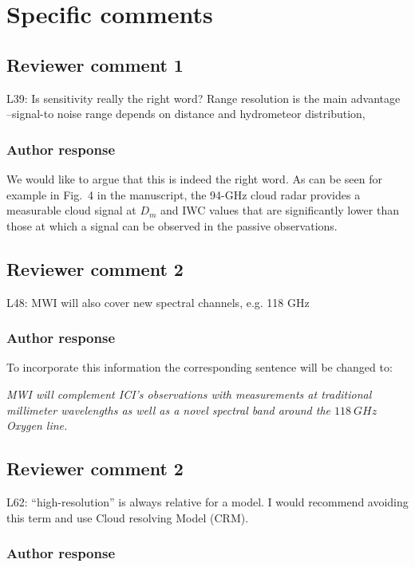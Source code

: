\documentclass[11pt]{scrartcl}
\begin{document}
\section{Specific comments}
\subsection*{Reviewer comment 1}
L39:  Is sensitivity really the right word?   Range resolution is the main advantage –signal-to noise range depends on distance and hydrometeor distribution,

\subsubsection*{Author response}

We would like to argue that this is indeed the right word. As can be seen for
example in Fig.~4 in the manuscript, the 94-GHz cloud radar provides a
measurable cloud signal at $D_m$ and IWC values that are significantly lower
than those at which a signal can be observed in the passive observations.

\subsection*{Reviewer comment 2}

L48: MWI will also cover new spectral channels, e.g. 118 GHz

\subsubsection*{Author response}

To incorporate this information the corresponding sentence will be changed to:

{\itshape MWI will complement ICI's observations with measurements at traditional
  millimeter wavelengths as well as a novel spectral band around the
  $118\ \unit{GHz}$ Oxygen line.}

\subsection*{Reviewer comment 2}

L62: “high-resolution” is always relative for a model. I would recommend avoiding this term and use Cloud resolving Model (CRM).

\subsubsection*{Author response}
\end{document}

